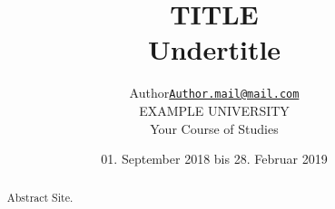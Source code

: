 \documentclass[xcolor=dvipsnames,11pt,paper=a4paper]{report}
\title{
	\Huge\textbf{TITLE}\\\vspace{20pt}
	\huge{Undertitle}
}
\author{
	\begin{tabular}{l l}
	Author &
	\href{mailto:Author.mail@mail.com}{\texttt{Author.mail@mail.com}}\\
	&EXAMPLE UNIVERSITY\\
	&Your Course of Studies
	\end{tabular}
}
\date{01. September 2018 bis 28. Februar 2019}
\begin{document}

\begin{titlepage}
\begin{center}
\end{center}
{\let\newpage\relax\maketitle}
\end{titlepage}

\begin{abstract}

Abstract Site.

\pagebreak
\end{abstract}
\tableofcontents
\pagebreak

\begingroup
\let\clearpage\relax
\lstlistoflistings
\listoffigures
\listoftables
\endgroup
\pagebreak

%

%

%


%


%

%

%


\end{document}
